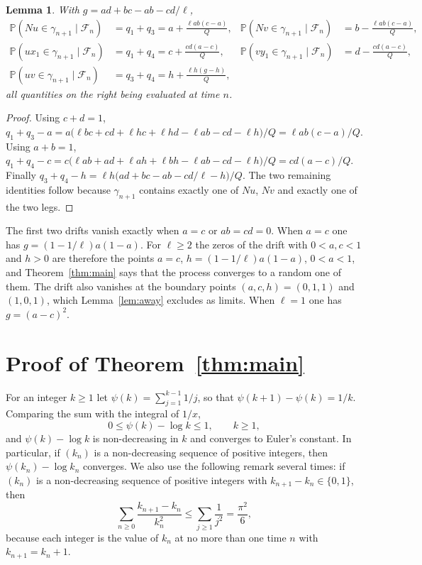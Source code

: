 \documentclass[11pt]{amsart}
\newtheorem{lemma}[theorem]{Lemma}
\theoremstyle{remark}
\newcommand{\PP}{\mathbb{P}}
\newcommand{\cF}{\mathcal{F}}
\begin{document}
\begin{lemma}\label{lem:drift}
With $g=ad+bc-ab-cd/\ell$,
\begin{align*}
\PP(Nu\in\gamma_{n+1}\mid\cF_n)&=q_1+q_3=a+\frac{\ell ab(c-a)}{Q}, &
\PP(Nv\in\gamma_{n+1}\mid\cF_n)&=b-\frac{\ell ab(c-a)}{Q},\\
\PP(ux_1\in\gamma_{n+1}\mid\cF_n)&=q_1+q_4=c+\frac{cd(a-c)}{Q}, &
\PP(vy_1\in\gamma_{n+1}\mid\cF_n)&=d-\frac{cd(a-c)}{Q},\\
\PP(uv\in\gamma_{n+1}\mid\cF_n)&=q_3+q_4=h+\frac{\ell h(g-h)}{Q}, &&
\end{align*}
all quantities on the right being evaluated at time $n$.
\end{lemma}
\begin{proof}
Using $c+d=1$,
$q_1+q_3-a=a\bigl(\ell bc+cd+\ell hc+\ell hd-\ell ab-cd-\ell h\bigr)/Q=\ell ab(c-a)/Q$. Using $a+b=1$,
$q_1+q_4-c=c\bigl(\ell ab+ad+\ell ah+\ell bh-\ell ab-cd-\ell h\bigr)/Q=cd(a-c)/Q$. Finally
$q_3+q_4-h=\ell h\bigl(ad+bc-ab-cd/\ell-h\bigr)/Q$. The two remaining identities follow because $\gamma_{n+1}$
contains exactly one of $Nu$, $Nv$ and exactly one of the two legs.
\end{proof}

The first two drifts vanish exactly when $a=c$ or $ab=cd=0$. When $a=c$ one has $g=(1-1/\ell)a(1-a)$. For $\ell\ge2$
the zeros of the drift with $0<a,c<1$ and $h>0$ are therefore the points $a=c$, $h=(1-1/\ell)a(1-a)$, $0<a<1$, and
Theorem~\ref{thm:main} says that the process converges to a random one of them. The drift also vanishes at the
boundary points $(a,c,h)=(0,1,1)$ and $(1,0,1)$, which Lemma~\ref{lem:away} excludes as limits. When $\ell=1$ one has
$g=(a-c)^2$.

\section{Proof of Theorem~\ref{thm:main}}\label{sec:proof}

For an integer $k\ge1$ let $\psi(k)=\sum_{j=1}^{k-1}1/j$, so that $\psi(k+1)-\psi(k)=1/k$. Comparing the sum with the
integral of $1/x$,
\begin{equation}\label{eq:psi}
0\le\psi(k)-\log k\le1,\qquad k\ge1,
\end{equation}
and $\psi(k)-\log k$ is non-decreasing in $k$ and converges to Euler's constant. In particular, if $(k_n)$ is a
non-decreasing sequence of positive integers, then $\psi(k_n)-\log k_n$ converges. We also use the following remark
several times: if $(k_n)$ is a non-decreasing sequence of positive integers with $k_{n+1}-k_n\in\{0,1\}$, then
\begin{equation}\label{eq:pi}
\sum_{n\ge0}\frac{k_{n+1}-k_n}{k_n^2}\le\sum_{j\ge1}\frac1{j^2}=\frac{\pi^2}{6},
\end{equation}
because each integer is the value of $k_n$ at no more than one time $n$ with $k_{n+1}=k_n+1$.
\end{document}

